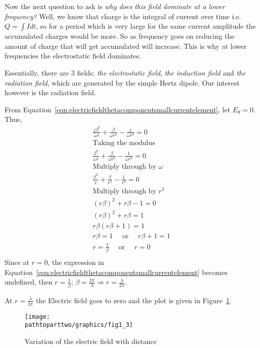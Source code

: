 Now the next question to ask is \emph{why does this field dominate at a lower frequency?} Well, we know that charge is the integral of current over time i.e. $Q =\int Idt$, so for a period which is very large for the same current amplitude the accumulated charges would be more. So as frequency goes on reducing the amount of charge that will get accumulated will increase. This is why at lower frequencies the electrostatic field dominates.

Essentially, there are 3 fields; \emph{the electrostatic field}, \emph{the induction field} and \emph{the radiation field}, which are generated by the simple Hertz dipole. Our interest however is the radiation field. 

From Equation~\eqref{eqn:electricfieldthetacomponentsmallcurrentelement}, let $E_{\theta} = 0$. Thus,
\begin{align*}
&\frac{j\beta^2}{\omega r} + \frac{\beta}{\omega r^2} - \frac{j}{\omega r^3} = 0&\\
&\text{Taking the modulus}&\\
&\frac{\beta^2}{\omega r} + \frac{\beta}{\omega r^2} - \frac{1}{\omega r^3} = 0&\\
&\text{Multiply through by $\omega$}&\\
&\frac{\beta^2}{r} + \frac{\beta}{r^2} - \frac{1}{r^3} = 0&\\
&\text{Multiply through by $r^3$}&\\
&(r\beta)^2 + r\beta - 1 = 0&\\
&(r\beta)^2 + r\beta = 1&\\
&r\beta(r\beta + 1) = 1&\\
&r\beta = 1\quad\text{ or }\quad r\beta + 1 = 1&\\
&r = \frac{1}{\beta}\quad\text{ or }\quad r = 0&\\
\end{align*}
Since at $ r = 0$, the expression in Equation~\eqref{eqn:electricfieldthetacomponentsmallcurrentelement} becomes undefined, then $ r = \frac{1}{\beta} $; $\beta = \frac{2\pi}{\lambda} \Longrightarrow r =  \frac{\lambda}{2 \pi} $.

At $ r =  \frac{\lambda}{2 \pi} $ the Electric field goes to zero and the plot is given in Figure~\ref{fig:electricfiedvariationwithdistance}.
\begin{figure}[h]
\centering
\texttt{[image: \\pathtoparttwo/graphics/fig1\_3]}
\caption{Variation of the electric field with distance}
\label{fig:electricfiedvariationwithdistance}
\end{figure}

